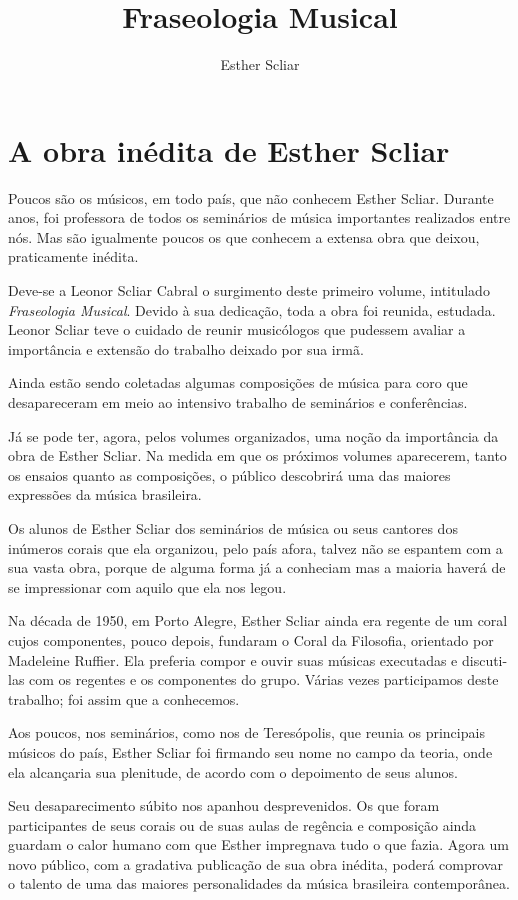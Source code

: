 \documentclass[a4paper]{book}
\title{Fraseologia Musical}
\author{Esther Scliar}
\begin{document}
\maketitle

\chapter*{A obra inédita de Esther Scliar}

Poucos são os músicos, em todo país, que não conhecem Esther Scliar. Durante anos, foi professora de todos os seminários de música importantes realizados entre nós. Mas são igualmente poucos os que conhecem a extensa obra que deixou, praticamente inédita.

Deve-se a Leonor Scliar Cabral o surgimento deste primeiro volume, intitulado \textit{Fraseologia Musical}. Devido à sua dedicação, toda a obra foi reunida, estudada. Leonor Scliar teve o cuidado de reunir musicólogos que pudessem avaliar a importância e extensão do trabalho deixado por sua irmã.

Ainda estão sendo coletadas algumas composições de música para coro que desapareceram em meio ao intensivo trabalho de seminários e conferências.

Já se pode ter, agora, pelos volumes organizados, uma noção da importância da obra de Esther Scliar. Na medida em que os próximos volumes aparecerem, tanto os ensaios quanto as composições, o público descobrirá uma das maiores expressões da música brasileira.

Os alunos de Esther Scliar dos seminários de música ou seus cantores dos inúmeros corais que ela organizou, pelo país afora, talvez não se espantem com a sua vasta obra, porque de alguma forma já a conheciam mas a maioria haverá de se impressionar com aquilo que ela nos legou.

Na década de 1950, em Porto Alegre, Esther Scliar ainda era regente de um coral cujos componentes, pouco depois, fundaram o Coral da Filosofia, orientado por Madeleine Ruffier. Ela  preferia compor e ouvir suas músicas executadas e discuti-las com os regentes e os componentes do grupo. Várias vezes participamos deste trabalho; foi assim que a conhecemos.

Aos poucos, nos seminários, como nos de Teresópolis, que reunia os principais músicos do país, Esther Scliar foi firmando seu nome no campo da teoria, onde ela alcançaria sua plenitude, de acordo com o depoimento de seus alunos.

Seu desaparecimento súbito nos apanhou desprevenidos. Os que foram participantes de seus corais ou de suas aulas de regência e composição ainda guardam o calor humano com que Esther impregnava tudo o que fazia. Agora um novo público, com a gradativa publicação de sua obra inédita, poderá comprovar o talento de uma das maiores personalidades da música brasileira contemporânea.
\end{document}
